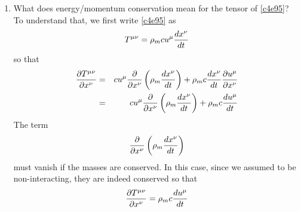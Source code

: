\begin{enumerate}
\item What does energy/momentum conservation mean for the tensor of 
\eqref{c4e95}?
To understand that, we first write \eqref{c4e95} as
\begin{equation}\label{c4e96}
T^{\mu\nu} = \rho_m c u^\mu\frac{d{x^\nu}}{d{t}}
\end{equation}
so that
\begin{eqnarray*}
\frac{\partial{T^{\mu\nu}}}{\partial{x^\nu}} &=& cu^\mu\frac{\partial}{\partial x^\nu}
	\left(\rho_m\frac{d{x^\nu}}{d{t}}\right)
+ \rho_m c\frac{d{x^\nu}}{d{t}}\frac{\partial{u^\mu}}{\partial{x^\nu}} \\
 &=& cu^\mu\frac{\partial}{\partial x^\nu}\left(\rho_m\frac{d{x^\nu}}{d{t}}\right) + 
 \rho_m c\frac{d{u^\mu}}{d{t}}
\end{eqnarray*}
The term
\[
\frac{\partial}{\partial x^\nu}\left(\rho_m\frac{d{x^\nu}}{d{t}}\right)
\]
must vanish if the masses are conserved. In this case, since we assumed to be
non-interacting, they are indeed conserved so that
\begin{equation}\label{c4e97}
\frac{\partial{T^{\mu\nu}}}{\partial{x^\nu}} = \rho_m c\frac{d{u^\mu}}{d{t}}
\end{equation}


\end{enumerate}
